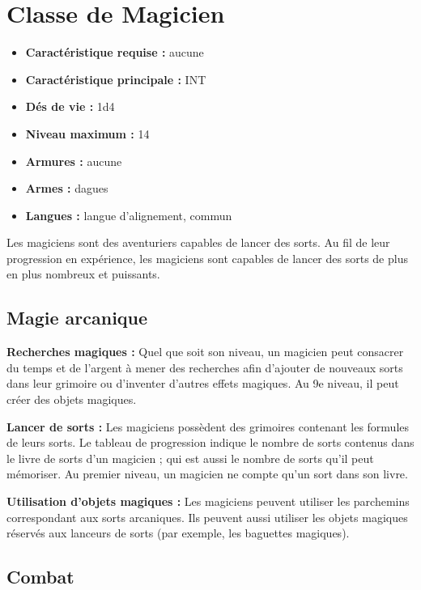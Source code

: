 
\section{Classe de Magicien}\label{magicien}
\begin{itemize}
  \item \textbf{Caractéristique requise :} aucune
  \item \textbf{Caractéristique principale :} INT
  \item \textbf{Dés de vie :} 1d4
  \item \textbf{Niveau maximum :} 14
  \item \textbf{Armures :} aucune
  \item \textbf{Armes :} dagues
  \item \textbf{Langues :} langue d'alignement, commun
\end{itemize}

Les magiciens sont des aventuriers capables de lancer des sorts.
Au fil de leur progression
en expérience, les magiciens sont capables de lancer des sorts de plus
en plus nombreux et puissants.

\subsection{Magie arcanique}\label{magie-arcanique}

\textbf{Recherches magiques :} Quel que soit son niveau, un magicien
peut consacrer du temps et de l'argent à mener des recherches afin
d'ajouter de nouveaux sorts dans leur grimoire ou d'inventer d'autres
effets magiques. Au 9e niveau, il peut créer des objets magiques.

\textbf{Lancer de sorts :} Les magiciens possèdent des grimoires
contenant les formules de leurs sorts. Le tableau de
progression indique le nombre de sorts contenus dans le livre
de sorts d'un magicien ; qui est aussi le nombre de sorts qu'il peut
mémoriser. Au premier niveau, un magicien ne compte qu'un sort dans son
livre.

\textbf{Utilisation d'objets magiques :} Les magiciens peuvent utiliser
les parchemins correspondant aux sorts arcaniques. Ils peuvent aussi
utiliser les objets magiques réservés aux lanceurs de sorts
(par exemple, les baguettes magiques).

\subsection{Combat}\label{combat}

